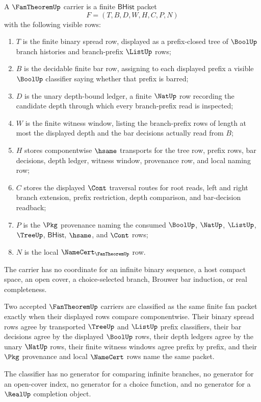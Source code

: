 \begin{definition}
\label{def:fan-theorem-binary-spread-carrier}
A $\FanTheoremUp$ carrier is a finite $\mathsf{BHist}$ packet
$$
F=(T,B,D,W,H,C,P,N)
$$
with the following visible rows:
\begin{enumerate}
\item $T$ is the finite binary spread row, displayed as a prefix-closed tree of $\BoolUp$ branch histories and branch-prefix $\ListUp$ rows;
\item $B$ is the decidable finite bar row, assigning to each displayed prefix a visible $\BoolUp$ classifier saying whether that prefix is barred;
\item $D$ is the unary depth-bound ledger, a finite $\NatUp$ row recording the candidate depth through which every branch-prefix read is inspected;
\item $W$ is the finite witness window, listing the branch-prefix rows of length at most the displayed depth and the bar decisions actually read from $B$;
\item $H$ stores componentwise $\hsame$ transports for the tree row, prefix rows, bar decisions, depth ledger, witness window, provenance row, and local naming row;
\item $C$ stores the displayed $\Cont$ traversal routes for root reads, left and right branch extension, prefix restriction, depth comparison, and bar-decision readback;
\item $P$ is the $\Pkg$ provenance naming the consumed $\BoolUp$, $\NatUp$, $\ListUp$, $\TreeUp$, $\mathsf{BHist}$, $\hsame$, and $\Cont$ rows;
\item $N$ is the local $\NameCert_{\FanTheoremUp}$ row.
\end{enumerate}
The carrier has no coordinate for an infinite binary sequence, a host compact space, an open cover, a choice-selected branch, Brouwer bar induction, or real completeness.
\end{definition}

\begin{definition}
\label{def:fan-theorem-bar-classifier}
Two accepted $\FanTheoremUp$ carriers are classified as the same finite fan packet exactly when their displayed rows compare componentwise. Their binary spread rows agree by transported $\TreeUp$ and $\ListUp$ prefix classifiers, their bar decisions agree by the displayed $\BoolUp$ rows, their depth ledgers agree by the unary $\NatUp$ rows, their finite witness windows agree prefix by prefix, and their $\Pkg$ provenance and local $\NameCert$ rows name the same packet.

The classifier has no generator for comparing infinite branches, no generator for an open-cover index, no generator for a choice function, and no generator for a $\RealUp$ completion object.
\end{definition}

